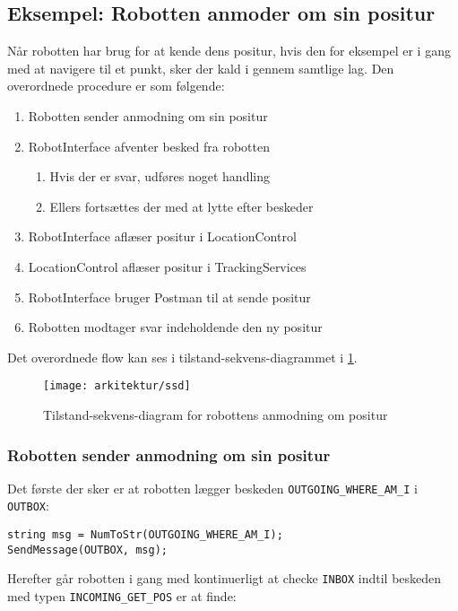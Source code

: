 \subsection{Eksempel: Robotten anmoder om sin positur}
Når robotten har brug for at kende dens positur, hvis den for eksempel er i gang med at navigere til et punkt, sker der kald i gennem samtlige lag.
Den overordnede procedure er som følgende:
\begin{enumerate}
\item{Robotten sender anmodning om sin positur}
\item{RobotInterface afventer besked fra robotten}
\begin{enumerate}
\item{Hvis der er svar, udføres noget handling}
\item{Ellers fortsættes der med at lytte efter beskeder}
\end{enumerate}
\item{RobotInterface aflæser positur i LocationControl}
\item{LocationControl aflæser positur i TrackingServices}
\item{RobotInterface bruger Postman til at sende positur}
\item{Robotten modtager svar indeholdende den ny positur}
\end{enumerate}
Det overordnede flow kan ses i tilstand-sekvens-diagrammet i \cref{flow:ssd}.

\begin{figure}[H]
\centering
\texttt{[image: arkitektur/ssd]}
\caption{Tilstand-sekvens-diagram for robottens anmodning om positur}
\label{flow:ssd}
\end{figure}

\subsubsection{Robotten sender anmodning om sin positur}
Det første der sker er at robotten lægger beskeden \lstinline[style=c]!OUTGOING_WHERE_AM_I! i \lstinline[style=c]!OUTBOX!:

\begin{lstlisting}[style=csmall,label=lst:whereami_request,caption=Robotten sender anmodning om positur]
string msg = NumToStr(OUTGOING_WHERE_AM_I);
SendMessage(OUTBOX, msg);
\end{lstlisting}

Herefter går robotten i gang med kontinuerligt at checke \lstinline[style=c]!INBOX! indtil beskeden med typen \lstinline[style=c]!INCOMING_GET_POS! er at finde:

